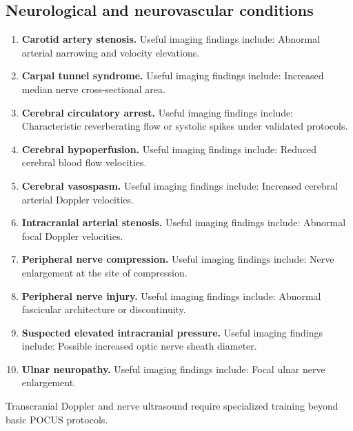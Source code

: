 \subsection{Neurological and neurovascular conditions}
\begin{enumerate}[leftmargin=*,itemsep=0.45em,topsep=0.4em]
\item \textbf{Carotid artery stenosis.} Useful imaging findings include: Abnormal arterial narrowing and velocity elevations.
\item \textbf{Carpal tunnel syndrome.} Useful imaging findings include: Increased median nerve cross-sectional area.
\item \textbf{Cerebral circulatory arrest.} Useful imaging findings include: Characteristic reverberating flow or systolic spikes under validated protocols.
\item \textbf{Cerebral hypoperfusion.} Useful imaging findings include: Reduced cerebral blood flow velocities.
\item \textbf{Cerebral vasospasm.} Useful imaging findings include: Increased cerebral arterial Doppler velocities.
\item \textbf{Intracranial arterial stenosis.} Useful imaging findings include: Abnormal focal Doppler velocities.
\item \textbf{Peripheral nerve compression.} Useful imaging findings include: Nerve enlargement at the site of compression.
\item \textbf{Peripheral nerve injury.} Useful imaging findings include: Abnormal fascicular architecture or discontinuity.
\item \textbf{Suspected elevated intracranial pressure.} Useful imaging findings include: Possible increased optic nerve sheath diameter.
\item \textbf{Ulnar neuropathy.} Useful imaging findings include: Focal ulnar nerve enlargement.
\end{enumerate}
Transcranial Doppler and nerve ultrasound require specialized training beyond basic POCUS protocols.

